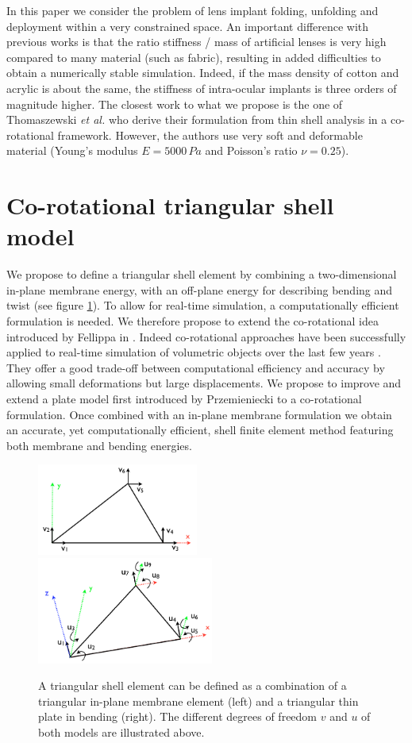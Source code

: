 \documentclass{llncs}
\begin{document}
In this paper we consider the problem of lens implant folding, unfolding and deployment within a very constrained space. An important difference with previous works is that the ratio stiffness / mass of artificial lenses is very high compared to many material (such as fabric), resulting in added difficulties to obtain a numerically stable simulation. Indeed, if the mass density of cotton and acrylic is about the same, the stiffness of intra-ocular implants is three orders of magnitude higher. The closest work to what we propose is the one of Thomaszewski \emph{et al.} \cite{Thomaszewski06} who derive their formulation from thin shell analysis in a co-rotational framework. However, the authors use very soft and deformable material (Young's modulus $E = 5000\,Pa$ and Poisson's ratio $\nu = 0.25$).

\section{Co-rotational triangular shell model}

We propose to define a triangular shell element by combining a two-dimensional in-plane membrane energy, with an off-plane energy for describing bending and twist (see figure \ref{fig-triangle}). To allow for real-time simulation, a computationally efficient formulation is needed. We therefore propose to extend the co-rotational idea introduced by Fellippa in \cite{Felippa00}. Indeed co-rotational approaches have been successfully applied to real-time simulation of volumetric objects over the last few years \cite{Muller04}. They offer a good trade-off between computational efficiency and accuracy by allowing small deformations but large displacements. We propose to improve and extend a plate model first introduced by Przemieniecki \cite{Przemieniecki68} to a co-rotational formulation. Once combined with an in-plane membrane formulation we obtain an accurate, yet computationally efficient, shell finite element method featuring both membrane and bending energies. 

\begin{figure}
\centering
\includegraphics[height=3cm]{images/triangle_membrane}
\includegraphics[height=3.5cm]{images/triangle_bending}
\caption {A triangular shell element can be defined as a combination of a triangular in-plane membrane element (left) and a triangular thin plate in bending (right). The different degrees of freedom $v$ and $u$ of both models are illustrated above.}
\label{fig-triangle}
\end{figure}
\end{document}
